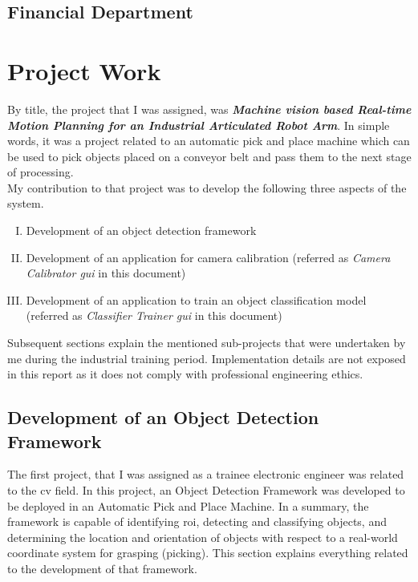 \documentclass[a4paper,12pt]{report}%
\begin{document}
\section{Financial Department}

\chapter{Project Work}
\label{Project Work}
By title, the project that I was assigned, was \textbf{\textit{Machine vision based Real-time Motion Planning for an Industrial Articulated Robot Arm}}. In simple words, it was a project related to an automatic pick and place machine which can be used to pick objects placed on a conveyor belt and pass them to the next stage of processing.\\

My contribution to that project was to develop the following three aspects of the system. 

\begin{enumerate}[I.]
	\item Development of an object detection framework
	
	\item Development of an application for camera calibration (referred as \textit{Camera Calibrator \ac{gui}} in this document)
	
	\item Development of an application to train an object classification model (referred as \textit{Classifier Trainer \ac{gui}} in this document)
	
\end{enumerate}

Subsequent sections explain the mentioned sub-projects that were undertaken by me during the industrial training period. Implementation details are not exposed in this report as it does not comply with professional engineering ethics.


\pagebreak
\section{Development of an Object Detection Framework}
\label{Development of an Object Detection Framework}
The first project, that I was assigned as a trainee electronic engineer was related to the \ac{cv} field. In this project, an Object Detection Framework was developed to be deployed in an Automatic Pick and Place Machine. In a summary, the framework is capable of identifying \ac{roi}, detecting and classifying objects, and determining the location and orientation of objects with respect to a real-world coordinate system for grasping (picking). This section explains everything related to the development of that framework.
\end{document}
